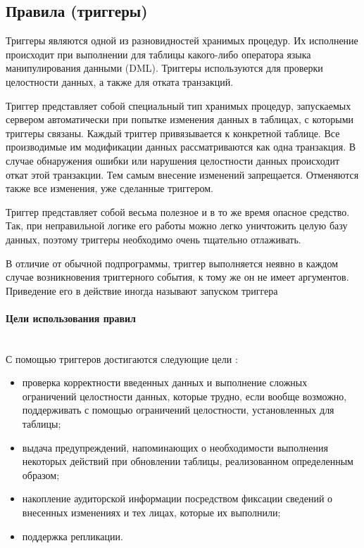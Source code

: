 \subsection{Правила (триггеры)}
Триггеры являются одной из разновидностей хранимых процедур. Их исполнение происходит при выполнении для таблицы какого-либо оператора языка манипулирования данными (DML). Триггеры используются для проверки целостности данных, а также для отката транзакций.


Триггер представляет собой специальный тип хранимых процедур, запускаемых сервером автоматически при попытке изменения данных в таблицах, с которыми триггеры связаны. Каждый триггер привязывается к конкретной таблице. Все производимые им модификации данных рассматриваются как одна транзакция. В случае обнаружения ошибки или нарушения целостности данных происходит откат этой транзакции. Тем самым внесение изменений запрещается. Отменяются также все изменения, уже сделанные триггером.


Триггер представляет собой весьма полезное и в то же время опасное средство. Так, при неправильной логике его работы можно легко уничтожить целую базу данных, поэтому триггеры необходимо очень тщательно отлаживать.


В отличие от обычной подпрограммы, триггер выполняется неявно в каждом случае возникновения триггерного события, к тому же он не имеет аргументов. Приведение его в действие иногда называют запуском триггера \autocite{IntuitTrigg}

\paragraph{Цели использования правил} ~\\

С помощью триггеров достигаются следующие цели \autocite{IntuitTrigg}:
\begin{itemize}
    \item проверка корректности введенных данных и выполнение сложных ограничений целостности данных, которые трудно, если вообще возможно, поддерживать с помощью ограничений целостности, установленных для таблицы;
    \item выдача предупреждений, напоминающих о необходимости выполнения некоторых действий при обновлении таблицы, реализованном определенным образом;
    \item накопление аудиторской информации посредством фиксации сведений о внесенных изменениях и тех лицах, которые их выполнили;
    \item поддержка репликации.
\end{itemize}

